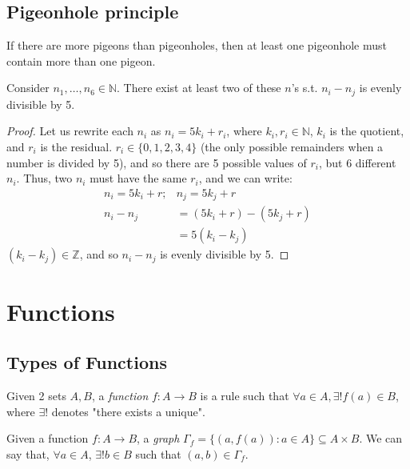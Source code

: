 \documentclass[12pt,oneside]{article}
\begin{document}
\subsection{Pigeonhole principle}
\begin{axiom}
  If there are more pigeons than pigeonholes, then at least one pigeonhole must contain more than one pigeon.\footnotemark
\end{axiom}

\begin{example}
  Consider $n_1, \dots, n_6 \in \mathbb{N}$. There exist at least two of these $n$'s s.t. $n_i - n_j$ is evenly divisible by 5.
  \begin{proof}
    Let us rewrite each $n_i$ as $n_i = 5k_i + r_i$, where $k_i, r_i \in \mathbb{N}$, $k_i$ is the quotient, and $r_i$ is the residual. $r_i \in \{0, 1, 2, 3, 4\}$ (the only possible remainders when a number is divided by 5), and so there are 5 possible values of $r_i$, but 6 different $n_i$. Thus, two $n_i$ must have the same $r_i$, and we can write: 
    \begin{align*}
      n_i = 5k_i + r; &n_j = 5k_j + r\\
      n_i - n_j &= (5k_i + r) - (5k_j + r)\\
      &= 5(k_i-k_j)
    \end{align*}
    $(k_i - k_j) \in \mathbb{Z}$, and so $n_i - n_j$ is evenly divisible by 5. 
  \end{proof}
\end{example}

\section{Functions}

\subsection{Types of Functions}
\begin{definition}[Function]
  Given 2 sets $A, B$, a \emph{function} $f: A \to B$ is a rule such that $\forall a \in A, \exists! f(a) \in B$, where $\exists!$ denotes "there exists a unique".
  
\end{definition}

\begin{definition}[Graph]
  Given a function $f: A \to B$, a \emph{graph} $\Gamma_f = \{(a,f(a)) : a \in A\} \subseteq A \times B$. We can say that, $\forall a \in A$, $\exists! b \in B$ such that $(a,b) \in \Gamma_f$.
\end{definition}
\end{document}
